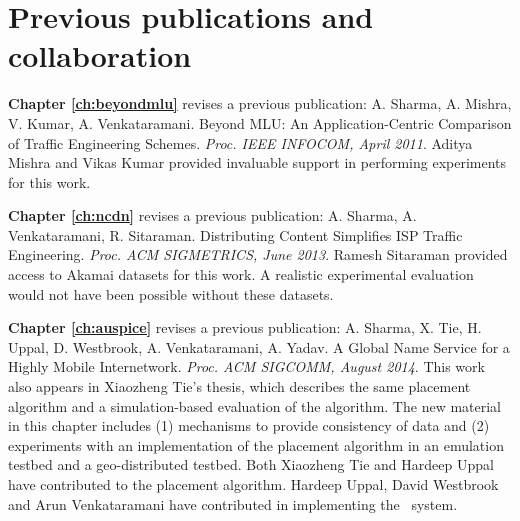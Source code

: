 \section{Previous publications and collaboration}

\textbf{Chapter \ref{ch:beyondmlu}} revises a previous publication: A. Sharma, A. Mishra, V. Kumar, A. Venkataramani. Beyond MLU: An Application-Centric Comparison of Traffic Engineering Schemes. \emph{Proc. IEEE INFOCOM, April 2011}. Aditya Mishra and Vikas Kumar provided invaluable support in performing experiments for this work.

\textbf{Chapter \ref{ch:ncdn}} revises a previous publication: A. Sharma, A. Venkataramani, R. Sitaraman. Distributing Content Simplifies ISP Traffic Engineering. \emph{Proc. ACM SIGMETRICS, June 2013}. Ramesh Sitaraman provided access to Akamai datasets for this work. A realistic experimental evaluation would not have been possible without these datasets.

\textbf{Chapter \ref{ch:auspice}} revises a previous publication: A. Sharma, X. Tie, H. Uppal, D. Westbrook, A. Venkataramani, A. Yadav. A Global Name Service for a Highly Mobile Internetwork. \emph{Proc. ACM SIGCOMM, August 2014}. 
This work also appears in Xiaozheng Tie's thesis, which describes the same placement algorithm and a simulation-based evaluation of the algorithm. The new material in this chapter includes (1) mechanisms to provide consistency of data and (2) experiments with an implementation of the placement algorithm in an emulation testbed and a geo-distributed testbed. Both Xiaozheng Tie and Hardeep Uppal have contributed to the placement algorithm. Hardeep Uppal, David Westbrook and Arun Venkataramani have contributed in implementing the \auspice\ system.

